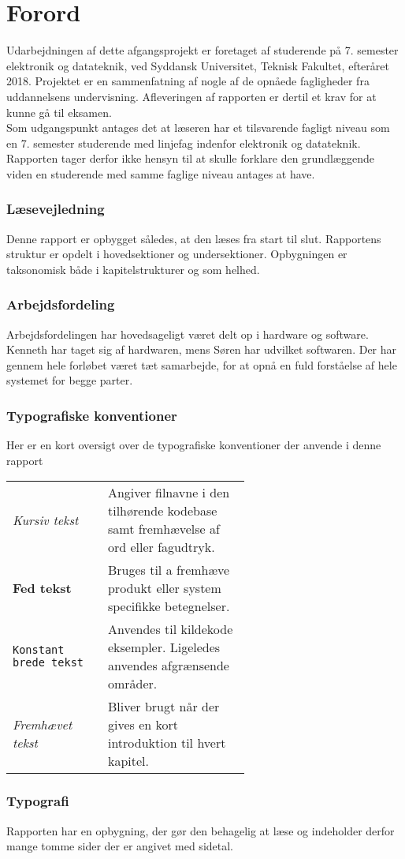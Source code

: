 \chapter*{Forord}\label{chap:forord}

Udarbejdningen af dette afgangsprojekt er foretaget af studerende på 7. semester elektronik og datateknik, ved Syddansk Universitet, Teknisk Fakultet, efteråret 2018. Projektet er en sammenfatning af nogle af de opnåede fagligheder fra uddannelsens undervisning. Afleveringen af rapporten er dertil et krav for at kunne gå til eksamen.\\

Som udgangspunkt antages det at læseren har et tilsvarende fagligt niveau som en 7. semester studerende med linjefag indenfor elektronik og datateknik.
Rapporten tager derfor ikke hensyn til at skulle forklare den grundlæggende viden en studerende med samme faglige niveau antages at have.

\subsection{Læsevejledning}
Denne rapport er opbygget således, at den læses fra start til slut. Rapportens struktur er opdelt i hovedsektioner og undersektioner. Opbygningen er taksonomisk både i kapitelstrukturer og som helhed.

\subsection{Arbejdsfordeling}
Arbejdsfordelingen har hovedsageligt været delt op i hardware og software. Kenneth har taget sig af hardwaren, mens Søren har udvilket softwaren. Der har gennem hele forløbet været tæt samarbejde, for at opnå en fuld forståelse af hele systemet for begge parter. 

\subsection{Typografiske konventioner}
Her er en kort oversigt over de typografiske konventioner der anvende i denne rapport\\
\begin{tabular}{l p{0.6\linewidth}}
	\textit{Kursiv tekst}			& Angiver filnavne i den tilhørende kodebase samt fremhævelse af ord eller fagudtryk. \\
	\textbf{Fed tekst}				& Bruges til a fremhæve produkt eller system specifikke betegnelser.\\
	\texttt{Konstant brede tekst}	& Anvendes til kildekode eksempler. Ligeledes anvendes afgrænsende områder.\\
	\emph{Fremhævet tekst}		    & Bliver brugt når der gives en kort introduktion til hvert kapitel.\\
\end{tabular}

\subsection{Typografi}
Rapporten har en opbygning, der gør den behagelig at læse og indeholder derfor mange tomme sider der er angivet med sidetal.
